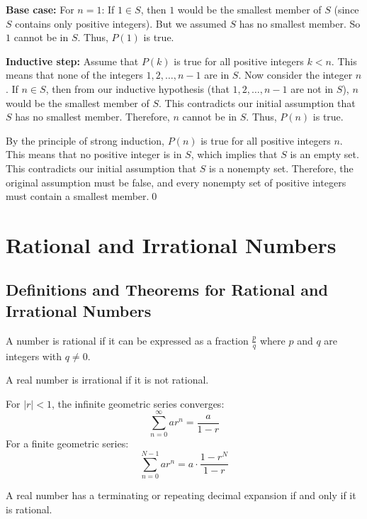 \textbf{Base case:}
For $n=1$: If $1 \in S$, then $1$ would be the smallest member of $S$ (since $S$ contains only positive integers). But we assumed $S$ has no smallest member. So $1$ cannot be in $S$. Thus, $P(1)$ is true.

\textbf{Inductive step:}
Assume that $P(k)$ is true for all positive integers $k < n$. This means that none of the integers $1, 2, \dots, n-1$ are in $S$.
Now consider the integer $n$. If $n \in S$, then from our inductive hypothesis (that $1, 2, \dots, n-1$ are not in $S$), $n$ would be the smallest member of $S$.
This contradicts our initial assumption that $S$ has no smallest member.
Therefore, $n$ cannot be in $S$. Thus, $P(n)$ is true.

By the principle of strong induction, $P(n)$ is true for all positive integers $n$. This means that no positive integer is in $S$, which implies that $S$ is an empty set.
This contradicts our initial assumption that $S$ is a nonempty set.
Therefore, the original assumption must be false, and every nonempty set of positive integers must contain a smallest member.\qed

\section{Rational and Irrational Numbers}

\subsection*{Definitions and Theorems for Rational and Irrational Numbers}

\begin{definition}
A number is rational if it can be expressed as a fraction $\frac{p}{q}$ where $p$ and $q$ are integers with $q \neq 0$.
\end{definition}

\begin{definition}
A real number is irrational if it is not rational.
\end{definition}

\begin{theorem}
For $|r| < 1$, the infinite geometric series converges:
\[
\sum_{n=0}^{\infty} ar^n = \frac{a}{1-r}
\]
For a finite geometric series:
\[
\sum_{n=0}^{N-1} ar^n = a \cdot \frac{1-r^N}{1-r}
\]
\end{theorem}

\begin{theorem}
A real number has a terminating or repeating decimal expansion if and only if it is rational.
\end{theorem}

